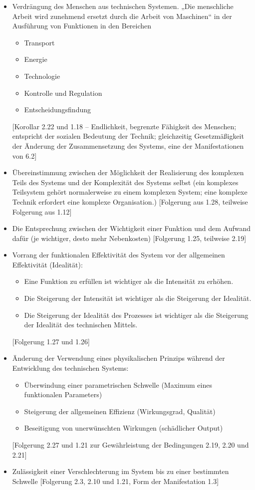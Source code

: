 \documentclass[11pt,a4paper]{article}
\begin{document}
\begin{itemize}
    1.18]
\item[2.24.] Verdrängung des Menschen aus technischen Systemen. „Die
  menschliche Arbeit wird zunehmend ersetzt durch die Arbeit von Maschinen“ in
  der Ausführung von Funktionen in den Bereichen
  \begin{itemize}
  \item Transport
  \item Energie
  \item Technologie
  \item Kontrolle und Regulation
  \item Entscheidungsfindung
  \end{itemize}
[Korollar 2.22 und 1.18 -- Endlichkeit, begrenzte Fähigkeit des Menschen;
  entspricht der sozialen Bedeutung der Technik; gleichzeitig Gesetzmäßigkeit
  der Änderung der Zusammensetzung des Systems, eine der Manifestationen von
  6.2]
\item[2.25.] Übereinstimmung zwischen der Möglichkeit der Realisierung des
  komplexen Teils des Systems und der Komplexität des Systems selbst (ein
  komplexes Teilsystem gehört normalerweise zu einem komplexen System; eine
  komplexe Technik erfordert eine komplexe Organisation.)  [Folgerung aus
    1.28, teilweise Folgerung aus 1.12]
\item[2.26.] Die Entsprechung zwischen der Wichtigkeit einer Funktion und dem
  Aufwand dafür (je wichtiger, desto mehr Nebenkosten) [Folgerung 1.25,
    teilweise 2.19]
\item[2.27.] Vorrang der funktionalen Effektivität des System vor der
  allgemeinen Effektivität (Idealität): 
  \begin{itemize}
  \item Eine Funktion zu erfüllen ist wichtiger als die Intensität zu erhöhen.
  \item Die Steigerung der Intensität ist wichtiger als die Steigerung der
    Idealität.
  \item Die Steigerung der Idealität des Prozesses ist wichtiger als die
    Steigerung der Idealität des technischen Mittels.
  \end{itemize}
  [Folgerung 1.27 und 1.26]
\item[2.28.] Änderung der Verwendung eines physikalischen Prinzips während der
  Entwicklung des technischen Systems:
  \begin{itemize}
  \item Überwindung einer parametrischen Schwelle (Maximum eines funktionalen
    Parameters)
  \item Steigerung der allgemeinen Effizienz (Wirkungsgrad, Qualität)
  \item Beseitigung von unerwünschten Wirkungen (schädlicher Output)
  \end{itemize}
[Folgerung 2.27 und 1.21 zur Gewährleistung der Bedingungen 2.19, 2.20 und
  2.21]
\item[2.29.] Zulässigkeit einer Verschlechterung im System bis zu einer
  bestimmten Schwelle [Folgerung 2.3, 2.10 und 1.21, Form der Manifestation
    1.3]
\end{itemize}
\end{document}
